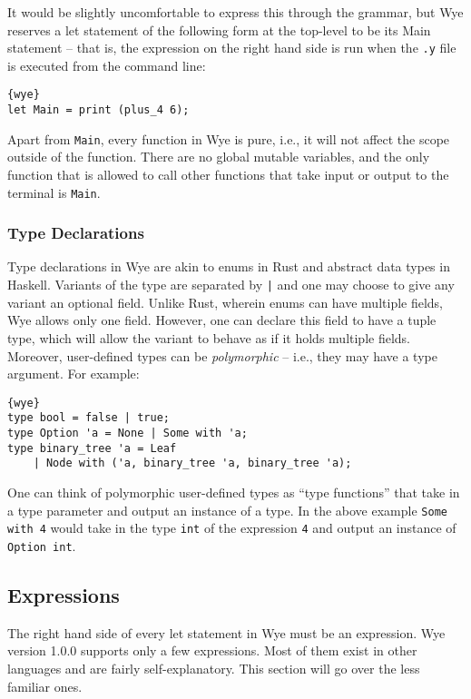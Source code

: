 \documentclass[a4paper, 12pt]{article}
\newcommand{\version}{1.0.0}
\begin{document}
It would be slightly uncomfortable to express this through the grammar, but Wye reserves a let statement of the following form at the top-level to be its Main statement -- that is, the expression on the right hand side is run when the \texttt{.y} file is executed from the command line:
\begin{lstlisting}{wye}
let Main = print (plus_4 6);
\end{lstlisting}
Apart from \texttt{Main}, every function in Wye is pure, i.e., it will not affect the scope outside of the function. There are no global mutable variables, and the only function that is allowed to call other functions that take input or output to the terminal is \texttt{Main}.

\subsubsection{Type Declarations}
Type declarations in Wye are akin to enums in Rust and abstract data types  in Haskell. Variants of the type are separated by \texttt{|} and one may choose to give any variant an optional field. Unlike Rust, wherein enums can have multiple fields, Wye allows only one field. However, one can declare this field to have a tuple type, which will allow the variant to behave as if it holds multiple fields. Moreover, user-defined types can be \textit{polymorphic} -- i.e., they may have a type argument. For example:
\begin{lstlisting}{wye}
type bool = false | true;
type Option 'a = None | Some with 'a;
type binary_tree 'a = Leaf
	| Node with ('a, binary_tree 'a, binary_tree 'a);
\end{lstlisting}
One can think of polymorphic user-defined types as ``type functions'' that take in a type parameter and output an instance of a type. In the above example \texttt{Some with 4} would take in the type \texttt{int} of the expression \texttt{4} and output an instance of \texttt{Option int}.

\subsection{Expressions}
The right hand side of every let statement in Wye must be an expression. Wye version \version{} supports only a few expressions. Most of them exist in other languages and are fairly self-explanatory. This section will go over the less familiar ones.
\end{document}
